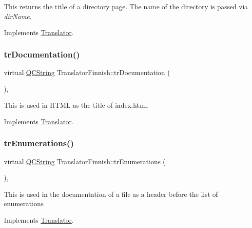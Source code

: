 This returns the title of a directory page. The name of the directory is passed via {\itshape dir\+Name}. 

Implements \mbox{\hyperlink{class_translator}{Translator}}.

\mbox{\label{class_translator_finnish_ac6c8e561bb70d8ef64a8e1066a86ba65}} 
\subsubsection{\texorpdfstring{trDocumentation()}{trDocumentation()}}
{\footnotesize\ttfamily virtual \mbox{\hyperlink{class_q_c_string}{Q\+C\+String}} Translator\+Finnish\+::tr\+Documentation (\begin{DoxyParamCaption}{ }\end{DoxyParamCaption})\hspace{0.3cm}{\ttfamily [inline]}, {\ttfamily [virtual]}}

This is used in H\+T\+ML as the title of index.\+html. 

Implements \mbox{\hyperlink{class_translator}{Translator}}.

\mbox{\label{class_translator_finnish_ac1c7621d405184ed334f47d12199dca7}} 
\subsubsection{\texorpdfstring{trEnumerations()}{trEnumerations()}}
{\footnotesize\ttfamily virtual \mbox{\hyperlink{class_q_c_string}{Q\+C\+String}} Translator\+Finnish\+::tr\+Enumerations (\begin{DoxyParamCaption}{ }\end{DoxyParamCaption})\hspace{0.3cm}{\ttfamily [inline]}, {\ttfamily [virtual]}}

This is used in the documentation of a file as a header before the list of enumerations 

Implements \mbox{\hyperlink{class_translator}{Translator}}.

\mbox{\label{class_translator_finnish_a327cd40f0311ab56fb3bf1d6f3258539}} 
